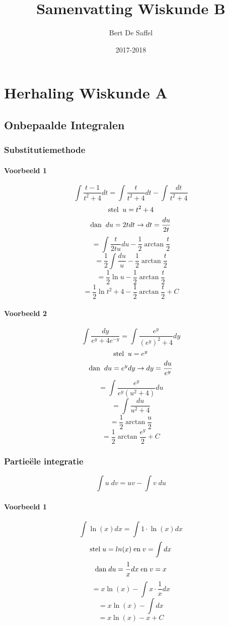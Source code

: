 \documentclass[12pt]{report}
\title{Samenvatting Wiskunde B}
\author{Bert De Saffel}
\date{2017-2018}
\begin{document}
\maketitle
\tableofcontents

\part{Herhaling Wiskunde A}
\chapter{Onbepaalde Integralen}
\section{Substitutiemethode}
\subsection{Voorbeeld 1}
$$\int \frac{t - 1}{t^2 + 4}dt = \int \frac{t}{t^2 + 4}dt - \int \frac{dt}{t^2 + 4}$$
$$\hbox{stel}\;\; u = t^2 + 4$$
$$\hbox{dan}\;\; du = 2tdt \rightarrow dt = \frac{du}{2t}$$
$$= \int \frac{t}{2t u} du - \frac{1}{2}\arctan{\frac{t}{2}}$$
$$= \frac{1}{2}\int \frac{du}{u} - \frac{1}{2}\arctan{\frac{t}{2}}$$
$$= \frac{1}{2}\ln{u} - \frac{1}{2}\arctan{\frac{t}{2}}$$
$$= \frac{1}{2}\ln{t^2 + 4} - \frac{1}{2}\arctan{\frac{t}{2}} + C$$
\subsection{Voorbeeld 2}
$$\int \frac{dy}{e^y + 4e^{-y}} = \int \frac{e^y}{(e^y)^2 + 4} dy$$
$$\hbox{stel}\;\; u = e^y$$
$$\hbox{dan}\;\; du = e^ydy \rightarrow dy = \frac{du}{e^y}$$
$$= \int \frac{e^y}{e^y(u^2 + 4)} du$$
$$= \int \frac{du}{u^2 + 4}$$
$$= \frac{1}{2}\arctan{\frac{u}{2}}$$
$$= \frac{1}{2}\arctan{\frac{e^y}{2}} + C$$
\section{Partieële integratie}
$$\int u\;dv = uv - \int v\;du$$
\subsection{Voorbeeld 1}
$$\int \ln(x) dx = \int 1\cdot \ln(x) dx$$
$$\hbox{stel}\; u = ln(x) \; \hbox{en}\; v = \int dx$$
$$\hbox{dan}\; du = \frac{1}{x}dx \; \hbox{en}\; v = x$$
$$= x\ln(x) - \int x\cdot\frac{1}{x}dx$$
$$= x\ln(x) - \int dx$$
$$= x\ln(x) - x + C$$
\end{document}

